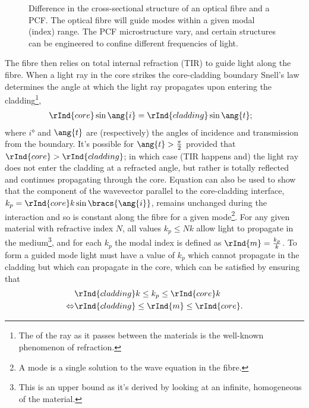 \begin{figure} [b!]
{
	}
	\caption{Difference in the cross-sectional structure of an optical fibre and a PCF. The optical fibre will guide modes within a given modal (index) range. The PCF microstructure vary, and certain structures can be engineered to confine different frequencies of light. \label{fig:FibreComparison}}
\end{figure}
The fibre then relies on total internal refraction (TIR) to guide light along the fibre.
When a light ray in the core strikes the core-cladding boundary Snell's law determines the angle at which the light ray propagates upon entering the cladding\footnote{The  of the ray as it passes between the materials is the well-known phenomenon of refraction.},
\begin{align} \label{eq:SnellsLaw}
	 \rInd{core}\sin\ang{i} &= \rInd{cladding}\sin\ang{t};
\end{align}
where $\ang{i}$ and $\ang{t}$ are (respectively) the angles of incidence and transmission from the boundary.
It's possible for $\ang{t}>\frac{\pi}{2}$ provided that $\rInd{core}>\rInd{cladding}$; in which case (TIR happens and) the light ray does not enter the cladding at a refracted angle, but rather is totally reflected and continues propagating through the core.
Equation  can also be used to show that the component of the wavevector parallel to the core-cladding interface, $k_{p} = \rInd{core}k\sin\bracs{\ang{i}}$, remains unchanged during the interaction and so is constant along the fibre for a given mode\footnote{A mode is a single solution to the wave equation in the fibre.}.
For any given material with refractive index $N$, all values $k_{p}\leq Nk$ allow light to propagate in the medium\footnote{This is an upper bound as it's derived by looking at an infinite, homogeneous  of the material.}, and for each $k_{p}$ the modal index is defined as $\rInd{m} = \frac{k_{p}}{k}$.
To form a guided mode light must have a value of $k_{p}$ which cannot propagate in the cladding but which can propagate in the core, which can be satisfied by ensuring that
\begin{align*}
	&\rInd{cladding}k \leq k_{p} \leq \rInd{core}k \\
	\Leftrightarrow &\rInd{cladding} \leq \rInd{m} \leq \rInd{core} .
\end{align*}

